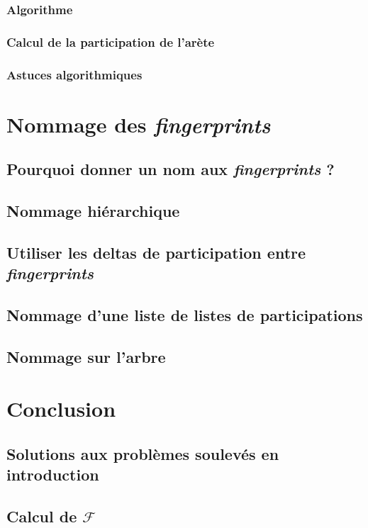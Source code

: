 \documentclass[a4paper,10pt]{article}
\begin{document}
\subsubsection{Algorithme}

\subsubsection{Calcul de la participation de l'arète}

\subsubsection{Astuces algorithmiques}

\section{Nommage des \textit{fingerprints}}

\subsection{Pourquoi donner un nom aux \textit{fingerprints} ?}

\subsection{Nommage hiérarchique}

\subsection{Utiliser les deltas de participation entre \textit{fingerprints}}

\subsection{Nommage d'une liste de listes de participations}

\subsection{Nommage sur l'arbre}

\section{Conclusion}

\subsection{Solutions aux problèmes soulevés en introduction}

\subsection{Calcul de $\mathcal{F}$}
\end{document}
